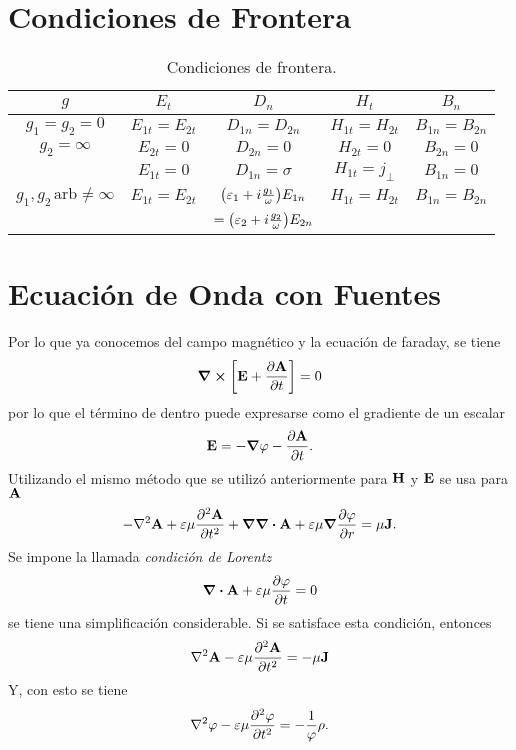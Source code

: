 \section{Condiciones de Frontera}
\begin{table}[H]
    \centering
    \begin{tabular}{c||cccc}
        $g$ & $E_t$ & $D_n$ & $H_t$ & $B_n$ \\
        \hline
        \hline
        $g_1 = g_2 = 0$ & $E_{1t} = E_{2t}$ & $D_{1n} = D_{2n}$ & $H_{1t} = H_{2t}$ & $B_{1n} = B_{2n}$ \\ 
        $g_2 = \infty$ & $E_{2t} = 0$ & $D_{2n} = 0$ & $H_{2t} = 0$ & $B_{2n} = 0$ \\
         & $E_{1t} = 0$ & $D_{1n} = \sigma$ & $H_{1t} = j_\perp$ & $B_{1n} = 0$ \\
        $g_1 ,g_2 \, \text{arb} \neq \infty$ & $E_{1t} = E_{2t}$ & $\qty(\varepsilon _1 + i\frac{g_1}{\omega}) E_{1n}$ & $H_{1t} = H_{2t}$ & $B_{1n} = B_{2n}$ \\
         & & $= \qty(\varepsilon _2 + i\frac{g_2}{\omega}) E_{2n}$ & & \\
    \end{tabular}
    \caption{Condiciones de frontera.}
    \label{tab:boundaryCond}
\end{table}

\section{Ecuación de Onda con Fuentes}
Por lo que ya conocemos del campo magnético y la ecuación de faraday, se tiene
\begin{equation}
    \curl{\qty[\vb{E} + \pdv{\vb{A}}{t}]} = 0
\end{equation}
por lo que el término de dentro puede expresarse como el gradiente de un escalar
\begin{equation}
    \vb{E} = -\grad{\varphi} - \pdv{\vb{A}}{t}.
\end{equation}
Utilizando el mismo método que se utilizó anteriormente para  $\vb{H}$ y $\vb{E}$ se usa para $\vb{A}$
\begin{equation}
    -\laplacian{\vb{A}} + \varepsilon \mu \pdv[2]{\vb{A}}{t} + \grad{\div{\vb{A}}} + \varepsilon \mu \grad{\pdv{\varphi}{r}} = \mu \vb{J}.
\end{equation}
Se impone la llamada \textit{condición de Lorentz}
\begin{equation}
    \div{\vb{A}} + \varepsilon \mu \pdv{\varphi}{t} = 0
\end{equation}
se tiene una simplificación considerable. Si se satisface esta condición, entonces
\begin{equation}
    \laplacian{\vb{A}} - \varepsilon \mu \pdv[2]{\vb{A}}{t} = -\mu \vb{J}
\end{equation}
Y, con esto se tiene
\begin{equation}
    \laplacian{\varphi} - \varepsilon \mu \pdv[2]{\varphi}{t} = -\frac{1}{\varphi} \rho .
\end{equation}

